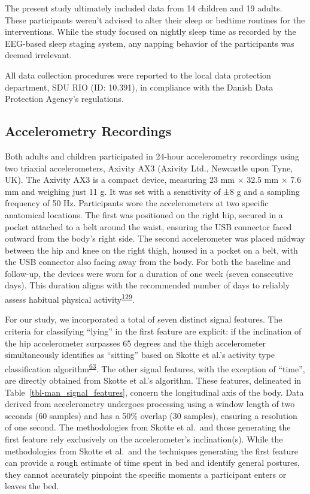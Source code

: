 \documentclass[
  10pt,
]{scrbook}
\begin{document}
The present study ultimately included data from 14 children and 19
adults. These participants weren't advised to alter their sleep or
bedtime routines for the interventions. While the study focused on
nightly sleep time as recorded by the EEG-based sleep staging system,
any napping behavior of the participants was deemed irrelevant.

All data collection procedures were reported to the local data
protection department, SDU RIO (ID: 10.391), in compliance with the
Danish Data Protection Agency's regulations.

\hypertarget{accelerometry-recordings}{%
\subsection{Accelerometry Recordings}\label{accelerometry-recordings}}

Both adults and children participated in 24-hour accelerometry
recordings using two triaxial accelerometers, Axivity AX3 (Axivity Ltd.,
Newcastle upon Tyne, UK). The Axivity AX3 is a compact device, measuring
23 mm × 32.5 mm × 7.6 mm and weighing just 11 g. It was set with a
sensitivity of ±8 g and a sampling frequency of 50 Hz. Participants wore
the accelerometers at two specific anatomical locations. The first was
positioned on the right hip, secured in a pocket attached to a belt
around the waist, ensuring the USB connector faced outward from the
body's right side. The second accelerometer was placed midway between
the hip and knee on the right thigh, housed in a pocket on a belt, with
the USB connector also facing away from the body. For both the baseline
and follow-up, the devices were worn for a duration of one week (seven
consecutive days). This duration aligns with the recommended number of
days to reliably assess habitual physical
activity\textsuperscript{\protect\hyperlink{ref-jaeschke_variability_2018}{129}}.

For our study, we incorporated a total of seven distinct signal
features. The criteria for classifying ``lying'' in the first feature
are explicit: if the inclination of the hip accelerometer surpasses 65
degrees and the thigh accelerometer simultaneously identifies as
``sitting'' based on Skotte et al.'s activity type classification
algorithm\textsuperscript{\protect\hyperlink{ref-skotte_detection_2014}{63}}.
The other signal features, with the exception of ``time'', are directly
obtained from Skotte et al.'s algorithm. These features, delineated in
Table~\ref{tbl-man_signal_features}, concern the longitudinal axis of
the body. Data derived from accelerometry undergoes processing using a
window length of two seconds (60 samples) and has a 50\% overlap (30
samples), ensuring a resolution of one second. The methodologies from
Skotte et al.~and those generating the first feature rely exclusively on
the accelerometer's inclination(s). While the methodologies from Skotte
et al.~and the techniques generating the first feature can provide a
rough estimate of time spent in bed and identify general postures, they
cannot accurately pinpoint the specific moments a participant enters or
leaves the bed.
\end{document}
